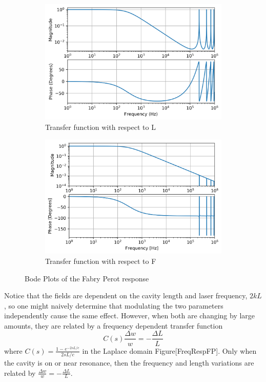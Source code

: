 		\begin{figure}[ht]
			\centering
			\begin{subfigure}[b]{0.45\textwidth}
				\centering
				\includegraphics[width=\textwidth]{../Figures/FP_L_TF.png}
				\caption{Transfer function with respect to L}
				\label{fig:FP_L}
			\end{subfigure}
			\hfill
			\begin{subfigure}[b]{0.45\textwidth}
				\centering
				\includegraphics[width=\textwidth]{../Figures/FP_F_TF.png}
				\caption{Transfer function with respect to F}
				\label{fig:FP_F}
			\end{subfigure}
			\caption{Bode Plots of the Fabry Perot response}
			\label{fig:FP_Bode}
		\end{figure}
		
		Notice that the fields are dependent on the cavity length and laser frequency, $2kL$, so one might naively determine that modulating the two parameters independently cause the same effect.  However, when both are changing by large amounts, they are related by a frequency dependent transfer function 
		\begin{equation}
		C(s) \frac{\Delta w}{w} = -\frac{\Delta L}{L}
		\end{equation}
		where $C(s) = \frac{1-e^{-2sL/c}}{2sL/c}$ in the Laplace domain Figure[FreqRespFP]. Only when the cavity is on or near resonance, then the frequency and length variations are related by $\frac{\Delta w}{w} = -\frac{\Delta L}{L}$.
		
